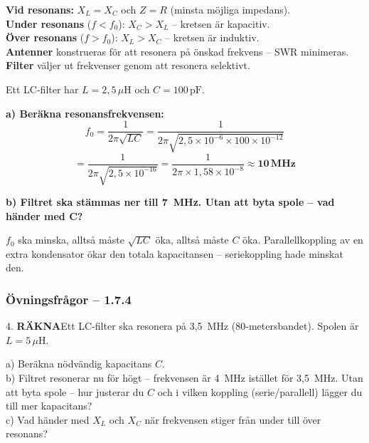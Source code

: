 \documentclass[a4paper,11pt,twoside]{book}
\newcommand{\emoji}[1]{{\emojifont #1}}
\newcommand{\qrakna}{\colorbox{bluepale}{\textcolor{bluedark}{\headingfont\bfseries\tiny RÄKNA}}}
\begin{document}
\begin{bluebox}[title={\emoji{🔑} Nyckelsamband -- resonans}]
\textbf{Vid resonans:} $X_L = X_C$ och $Z = R$ (minsta möjliga impedans).\\
\textbf{Under resonans} ($f < f_0$): $X_C > X_L$ -- kretsen är kapacitiv.\\
\textbf{Över resonans} ($f > f_0$): $X_L > X_C$ -- kretsen är induktiv.\\
\textbf{Antenner} konstrueras för att resonera på önskad frekvens -- SWR minimeras.\\
\textbf{Filter} väljer ut frekvenser genom att resonera selektivt.
\end{bluebox}

\begin{worked}[title={Räkneexempel 1.7.4 -- Resonansfrekvens för ett LC-filter}]
Ett LC-filter har $L = 2{,}5\,\mu\text{H}$ och
$C = 100\,\text{pF}$.

\textbf{a) Beräkna resonansfrekvensen:}
\[ f_0 = \frac{1}{2\pi\sqrt{LC}} =
   \frac{1}{2\pi\sqrt{2{,}5 \times 10^{-6} \times 100 \times 10^{-12}}} \]
\[ = \frac{1}{2\pi\sqrt{2{,}5 \times 10^{-16}}} =
   \frac{1}{2\pi \times 1{,}58 \times 10^{-8}} \approx \mathbf{10\,\text{MHz}} \]

\textbf{b) Filtret ska stämmas ner till 7~MHz.
Utan att byta spole -- vad händer med C?}

$f_0$ ska minska, alltså måste $\sqrt{LC}$ öka,
alltså måste $C$ öka. Parallellkoppling av en extra
kondensator ökar den totala kapacitansen -- seriekoppling
hade minskat den.
\end{worked}

\subsubsection*{Övningsfrågor -- 1.7.4}

\begin{qblock}{4.}
\qrakna\quad Ett LC-filter ska resonera på
3,5~MHz (80-metersbandet). Spolen är $L = 5\,\mu\text{H}$.

a) Beräkna nödvändig kapacitans $C$.\\
b) Filtret resonerar nu för högt -- frekvensen
är 4~MHz istället för 3,5~MHz. Utan att byta
spole -- hur justerar du $C$ och i vilken
koppling (serie/parallell) lägger du till mer
kapacitans?\\
c) Vad händer med $X_L$ och $X_C$ när frekvensen
stiger från under till över resonans?
\end{qblock}
\end{document}
